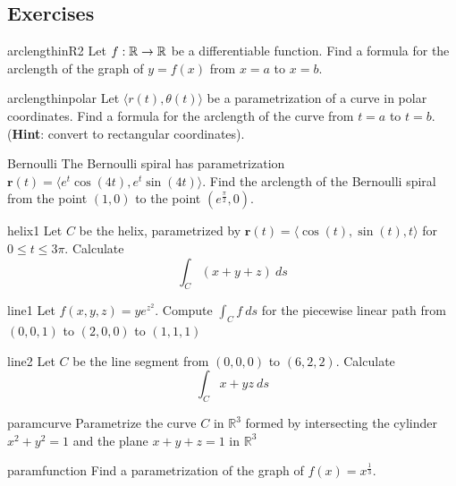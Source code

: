 \subsection{Exercises}

\begin{problem}{arclengthinR2}
    Let $f: \mathbb{R} \to \mathbb{R}$ be a differentiable function.  Find a formula for the arclength of the graph of $y = f(x)$ from $x=a$ to $x=b$.
\end{problem}

\begin{problem}{arclengthinpolar}
    Let $\langle r(t), \theta(t)\rangle$ be a parametrization of a curve in polar coordinates.  Find a formula for the arclength of the curve from $t=a$ to $t=b$.  (\textbf{Hint}: convert to rectangular coordinates).
\end{problem}

\begin{problem}{Bernoulli}
    The Bernoulli spiral has parametrization $\bm{r}(t) = \langle e^t\cos(4t), e^t\sin(4t) \rangle$.  Find the arclength of the Bernoulli spiral from the point $(1,0)$ to the point $(e^{\frac{\pi}{2}}, 0)$.
\end{problem}


\begin{problem}{helix1}
Let $C$ be the helix, parametrized by $\bm{r}(t) = \langle \cos(t), \sin(t), t \rangle$ for $0 \leq t \leq 3\pi$.  Calculate
    $$\int_C (x + y + z) \ ds$$
\end{problem}

\begin{problem}{line1}
Let $f(x,y,z) = ye^{z^2}$.  Compute $\int_C f \ ds$ for the piecewise linear path from $(0,0,1)$ to $(2,0,0)$ to $(1,1,1)$
\end{problem}

\begin{problem}{line2}
Let $C$ be the line segment from $(0,0,0)$ to $(6,2,2)$. Calculate $$\int_C x+yz \ ds$$
\end{problem}


\begin{problem}{paramcurve}
    Parametrize the curve $C$ in $\mathbb{R}^3$ formed by intersecting the cylinder $x^2 + y^2 = 1$ and the plane $x + y + z = 1$ in $\mathbb{R}^3$
\end{problem}

\begin{problem}{paramfunction}
    Find a parametrization of the graph of $f(x) = x^{\frac{1}{3}}$.
\end{problem}

